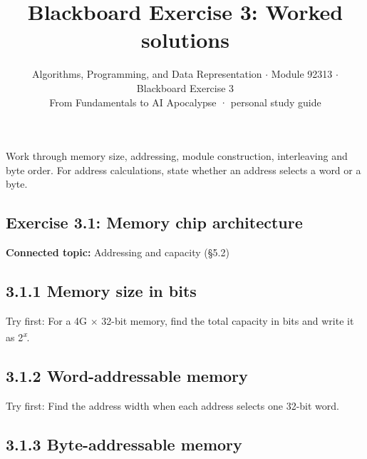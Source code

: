 \documentclass[11pt]{article}
\title{\sffamily\bfseries\color{FAUblue}Blackboard Exercise 3: Worked solutions}
\author{Algorithms, Programming, and Data Representation \ensuremath{\cdot} Module 92313 \ensuremath{\cdot} Blackboard Exercise 3\\[2pt]\small From Fundamentals to AI Apocalypse · personal study guide}
\date{}
\begin{document}
\maketitle
\begingroup\footnotesize\setlength{\parskip}{0pt}\tableofcontents\endgroup
\clearpage

{\large Work through memory size, addressing, module construction, interleaving and byte order. For address calculations, state whether an address selects a word or a byte.}


\begin{keepsection}
\section{Exercise 3.1: Memory chip architecture}

\textbf{Connected topic:} Addressing and capacity (§5.2)

\begin{keepsection}
\subsection{3.1.1 Memory size in bits}

Try first: For a 4G \ensuremath{\times} 32-bit memory, find the total capacity in bits and write it as 2\textsuperscript{\textit{x}}.

\end{keepsection}

\begin{keepsection}
\subsection{3.1.2 Word-addressable memory}

Try first: Find the address width when each address selects one 32-bit word.

\end{keepsection}

\begin{keepsection}
\subsection{3.1.3 Byte-addressable memory}


\end{keepsection}
\end{keepsection}
\end{document}
